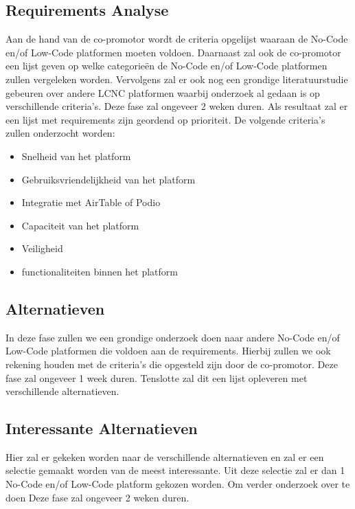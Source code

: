 \subsection*{Requirements Analyse}
\label{sub:requirements-analyse}
Aan de hand van de co-promotor wordt de criteria opgelijst waaraan de No-Code en/of Low-Code platformen moeten voldoen.
Daarnaast zal ook de co-promotor een lijst geven op welke categorieën de No-Code en/of Low-Code platformen zullen vergeleken worden. 
Vervolgens zal er ook nog een grondige literatuurstudie gebeuren over andere LCNC platformen waarbij onderzoek al gedaan is op verschillende
criteria's. Deze fase zal ongeveer 2 weken duren. Als resultaat zal er een lijst met requirements zijn geordend op prioriteit.
De volgende criteria's zullen onderzocht worden:
\begin{itemize}
  \item Snelheid van het platform
  \item Gebruiksvriendelijkheid van het platform
  \item Integratie met AirTable of Podio
  \item Capaciteit van het platform
  \item Veiligheid
  \item functionaliteiten binnen het platform
\end{itemize}

\subsection*{Alternatieven}
\label{sub:alternatieven}
In deze fase zullen we een grondige onderzoek doen naar andere No-Code en/of Low-Code platformen die voldoen aan de requirements.
Hierbij zullen we ook rekening houden met de criteria's die opgesteld zijn door de co-promotor. Deze fase zal ongeveer 1 week duren. Tenslotte 
zal dit een lijst opleveren met verschillende alternatieven.

\subsection*{Interessante Alternatieven}
\label{sub:interessante-alternatieven}
Hier zal er gekeken worden naar de verschillende alternatieven en zal er een selectie gemaakt worden van de meest interessante.
Uit deze selectie zal er dan 1 No-Code en/of Low-Code platform gekozen worden. Om verder onderzoek over te doen
Deze fase zal ongeveer 2 weken duren.

